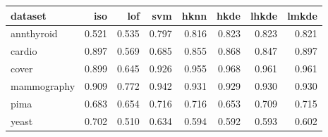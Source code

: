 \begin{tabular}{l|rrr|rrrr}
  \toprule
dataset & iso & lof & svm & hknn & hkde & lhkde & lmkde \\ 
  \midrule
annthyroid & 0.521 & 0.535 & 0.797 & 0.816 & 0.823 & 0.823 & 0.821 \\ 
  cardio & 0.897 & 0.569 & 0.685 & 0.855 & 0.868 & 0.847 & 0.897 \\ 
  cover & 0.899 & 0.645 & 0.926 & 0.955 & 0.968 & 0.961 & 0.961 \\ 
  mammography & 0.909 & 0.772 & 0.942 & 0.931 & 0.929 & 0.930 & 0.930 \\ 
  pima & 0.683 & 0.654 & 0.716 & 0.716 & 0.653 & 0.709 & 0.715 \\ 
  yeast & 0.702 & 0.510 & 0.634 & 0.594 & 0.592 & 0.593 & 0.602 \\ 
   \bottomrule
\end{tabular}

